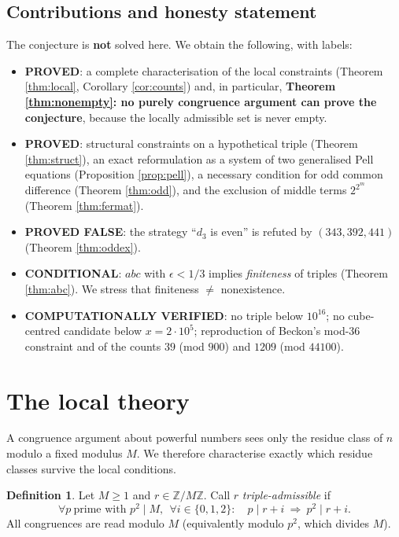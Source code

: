 \documentclass[11pt]{article}
\theoremstyle{definition}
\newtheorem{definition}[theorem]{Definition}
\begin{document}
\subsection{Contributions and honesty statement}

The conjecture is \textbf{not} solved here. We obtain the following, with labels:

\begin{itemize}[leftmargin=2em]
\item \textbf{PROVED}: a complete characterisation of the local constraints
(Theorem \ref{thm:local}, Corollary \ref{cor:counts}) and, in particular,
\textbf{Theorem \ref{thm:nonempty}: no purely congruence argument can prove the
conjecture}, because the locally admissible set is never empty.
\item \textbf{PROVED}: structural constraints on a hypothetical triple
(Theorem \ref{thm:struct}), an exact reformulation as a system of two generalised
Pell equations (Proposition \ref{prop:pell}), a necessary condition for odd common
difference (Theorem \ref{thm:odd}), and the exclusion of middle terms $2^{2^m}$
(Theorem \ref{thm:fermat}).
\item \textbf{PROVED FALSE}: the strategy ``$d_3$ is even'' is refuted by
$(343,392,441)$ (Theorem \ref{thm:oddex}).
\item \textbf{CONDITIONAL}: $abc$ with $\epsilon<1/3$ implies \emph{finiteness} of
triples (Theorem \ref{thm:abc}). We stress that finiteness $\neq$ nonexistence.
\item \textbf{COMPUTATIONALLY VERIFIED}: no triple below $10^{16}$; no cube-centred
candidate below $x=2\cdot10^5$; reproduction of Beckon's mod-$36$ constraint and of
the counts $39$ (mod $900$) and $1209$ (mod $44100$).
\end{itemize}

\section{The local theory}\label{sec:local}

A congruence argument about powerful numbers sees only the residue class of $n$
modulo a fixed modulus $M$. We therefore characterise exactly which residue classes
survive the local conditions.

\begin{definition}\label{def:admiss}
Let $M\ge1$ and $r\in\mathbb Z/M\mathbb Z$. Call $r$ \emph{triple-admissible} if
\[
\forall p \ \text{prime with } p^2\mid M,\ \ \forall i\in\{0,1,2\}:\quad
p \mid r+i \ \Longrightarrow\ p^2 \mid r+i .
\]
All congruences are read modulo $M$ (equivalently modulo $p^2$, which divides $M$).
\end{definition}
\end{document}
